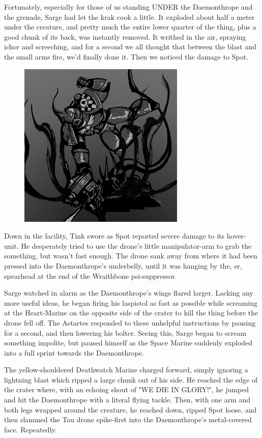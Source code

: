 Fortunately, especially for those of us standing UNDER the Daemonthrope and the grenade, Sarge had let the krak cook a little. 
It exploded about half a meter under the creature, and pretty much the entire lower quarter of the thing, plus a good chunk of its back, was instantly removed. 
It writhed in the air, spraying ichor and screeching, and for a second we all thought that between the blast and the small arms fire, we'd finally done it. 
Then we noticed the damage to Spot.

\begin{figure}
	\begin{center}
		\includegraphics[width=\figwidth]{pics/16/58.png}
	\end{center}
\end{figure}
Down in the facility, Tink swore as Spot reported severe damage to its hover-unit. 
He desperately tried to use the drone's little manipulator-arm to grab the something, but wasn't fast enough. 
The drone sank away from where it had been pressed into the Daemonthrope's underbelly, until it was hanging by the, er, spearhead at the end of the Wraithbone psi-suppressor.

Sarge watched in alarm as the Daemonthrope's wings flared larger. 
Lacking any more useful ideas, he began firing his laspistol as fast as possible while screaming at the Heart-Marine on the opposite side of the crater to kill the thing before the drone fell off. 
The Astartes responded to these unhelpful instructions by pausing for a second, and then lowering his bolter. 
Seeing this, Sarge began to scream something impolite, but paused himself as the Space Marine suddenly exploded into a full sprint towards the Daemonthrope.

The yellow-shouldered Deathwatch Marine charged forward, simply ignoring a lightning blast which ripped a large chunk out of his side. 
He reached the edge of the crater where, with an echoing shout of "WE DIE IN GLORY!", he jumped and hit the Daemonthrope with a literal flying tackle. 
Then, with one arm and both legs wrapped around the creature, he reached down, ripped Spot loose, and then slammed the Tau drone spike-first into the Daemonthrope's metal-covered face. 
Repeatedly.

